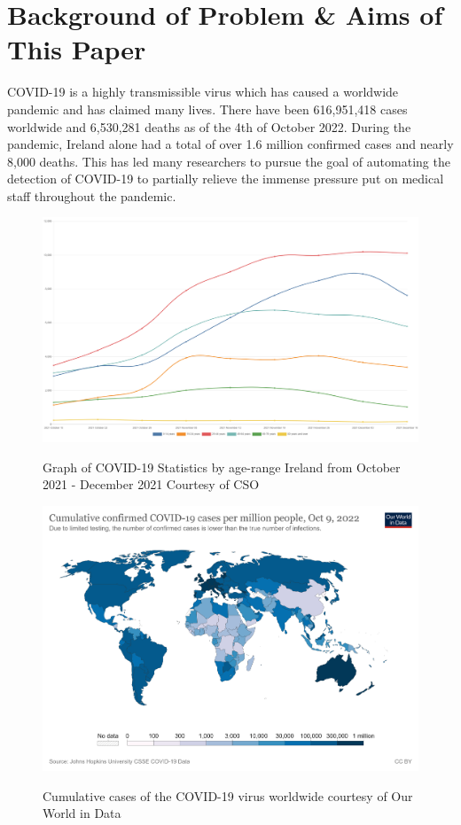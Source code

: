 \section{Background of Problem \& Aims of This Paper}
COVID-19 is a highly transmissible virus which has caused a worldwide pandemic and has claimed many lives. There have been 616,951,418 cases worldwide and 6,530,281 deaths as of the 4th of October 2022\cite{covid19StatsWorldwide}.  During the pandemic, Ireland alone had a total of over 1.6 million confirmed cases and nearly 8,000 deaths\cite{covid19StatsIreland}.  This has led many researchers to pursue the goal of automating the detection of COVID-19 to partially relieve the immense pressure put on medical staff throughout the pandemic. 
\vspace{0.5mm}
\begin{figure}[H]
    \centering
    \includegraphics[width=1\textwidth,keepaspectratio]{Images/COVID19IrelandFigures.png}\\
    \caption{Graph of COVID-19 Statistics by age-range Ireland from October 2021 - December 2021 Courtesy of CSO\cite{csoCovid19Stats}}
    \label{fig:COVID-19 Ireland Statistics}
\end{figure}
\begin{figure}[H]
    \centering
    \includegraphics[width=1\textwidth,keepaspectratio]{Images/coronavirusWorldWide.png}\\
    \caption{Cumulative cases of the COVID-19 virus worldwide courtesy of Our World in Data\cite{cumulativeCovid19Cases}}
    \label{fig:COVID-19 Worldwide Statistics}
\end{figure}
